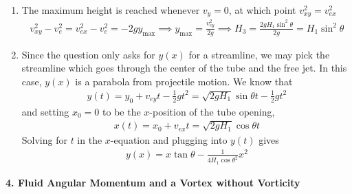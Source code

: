 \documentclass{article}
\theoremstyle{definition}
\newcommand{\f}[2]{\frac{#1}{#2}}
\begin{document}
\begin{enumerate}[label=(\alph*)]
	\item The maximum height is reached whenever $v_y = 0$, at which point $v_{xy}^2 = v_{ex}^2$ 
	\begin{align*}
	v_{xy}^2 - v_e^2 =  v_{ex}^2 - v_e^2= -2gy_\text{max} \implies y_\text{max} = {\f{v_{ey}^2}{2g}} \implies \boxed{H_3 = \f{2gH_1 \sin^2\theta}{2g} = H_1 \sin^2\theta}
	\end{align*}
	
	\item Since the question only asks for $y(x)$ for a streamline, we may pick the streamline which goes through the center of the tube and the free jet. In this case, $y(x)$ is a parabola from projectile motion. We know that
	\begin{align*}
	y(t) = y_0 + v_{ey} t - \f{1}{2}gt^2 = \sqrt{2g H_1} \sin\theta t - \f{1}{2} gt^2
	\end{align*}
	and setting $x_0 = 0$ to be the $x$-position of the tube opening, 
	\begin{align*}
	x(t) = x_0 + v_{ex} t  = \sqrt{2g H_1}\cos\theta t 
	\end{align*}
	Solving for $t$ in the $x$-equation and plugging into $y(t)$ gives
	\begin{align*}
	\boxed{y(x) = x\tan\theta - \f{1}{4 H_1  \cos\theta^2} x^2}
	\end{align*}
\end{enumerate}


\noindent \textbf{4. Fluid Angular Momentum and a Vortex without Vorticity}
\end{document}
